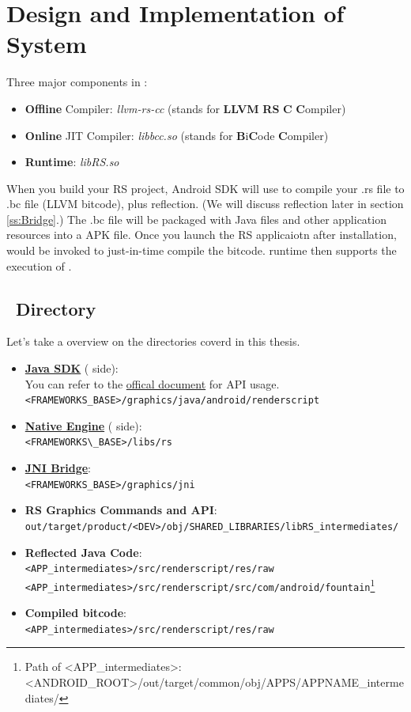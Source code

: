 \chapter{Design and Implementation of \RS{} System }
\label{c:OverviewRS}
Three major components in \RS{}: 
\begin{itemize}
    \item \textbf{Offline} Compiler: \textit{llvm-rs-cc} (stands for \textbf{LLVM} \textbf{RS} \textbf{C} \textbf{C}ompiler)
    \item \textbf{Online} JIT Compiler: \textit{libbcc.so} (stands for \textbf{B}i\textbf{C}ode \textbf{C}ompiler)
    \item \RS{} \textbf{Runtime}: \textit{libRS.so}
\end{itemize}
When you build your RS project, Android SDK will use \slang{} to compile your .rs file to .bc file (LLVM bitcode), plus reflection. (We will discuss reflection later in section \ref{ss:Bridge}.) The .bc file will be packaged with Java files and other application resources into a APK file. Once you launch the RS applicaiotn after installation, \bcc{} would be invoked to just-in-time compile the bitcode. \RS{} runtime then supports the execution of \Core{}. 

\section{\RS{}~Directory }
\label{s:RDS}

Let's take a overview on the directories coverd in this thesis.
\begin{itemize}
	\item \hyperref[ss:JavaClient]{\textbf{Java SDK}} (\Client{} side):\\
	        You can refer to the \href{http://developer.android.com/reference/android/renderscript/package-summary.html}{offical document} for API usage.\\
\verb|<FRAMEWORKS_BASE>/graphics/java/android/renderscript|\\
	\item \hyperref[ss:NativeEngine]{\textbf{Native Engine}} (\Core{} side):\\
\verb|<FRAMEWORKS\_BASE>/libs/rs|
	\item \hyperref[ss:Bridge]{\textbf{JNI Bridge}}:\\
\verb|<FRAMEWORKS_BASE>/graphics/jni|
	\item \textbf{RS Graphics Commands and API}:\\
\verb|out/target/product/<DEV>/obj/SHARED_LIBRARIES/libRS_intermediates/|
	\item \textbf{Reflected Java Code}:\\
\verb|<APP_intermediates>/src/renderscript/res/raw|\\
\verb|<APP_intermediates>/src/renderscript/src/com/android/fountain|\footnote{Path of <APP\_intermediates>: <ANDROID\_ROOT>/out/target/common/obj/APPS/APPNAME\_intermediates/}
	\item \textbf{Compiled bitcode}:\\
\verb|<APP_intermediates>/src/renderscript/res/raw|
\end{itemize} 

